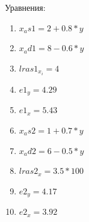 \documentclass[a4paper,12pt]{article}
\begin{document}
Уравнения:

\begin{enumerate}
    \item $x_as1 = 2 + 0.8 * y$
    \item $x_ad1 = 8 - 0.6 * y$
    \item $lras1_{x_i} = 4$
    \item $e1_y = 4.29 $
    \item $e1_x = 5.43$
    \item $x_as2 = 1 + 0.7 * y$
    \item $x_ad2 = 6 - 0.5 * y$
    \item $lras2_x = 3.5 * 100$
    \item $e2_y = 4.17 $
    \item $e2_x = 3.92 $
\end{enumerate}
\end{document}
